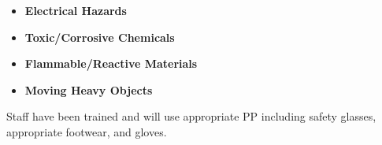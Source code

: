 \documentclass[12pt,oneside]{book}
\begin{document}
\begin{itemize}
\item {\bf Electrical Hazards}
\item {\bf Toxic/Corrosive Chemicals}
\item {\bf Flammable/Reactive Materials}
\item {\bf Moving Heavy Objects}
\end{itemize}
Staff have been trained and will use appropriate PP including safety glasses, appropriate footwear, and gloves.
\end{document}
